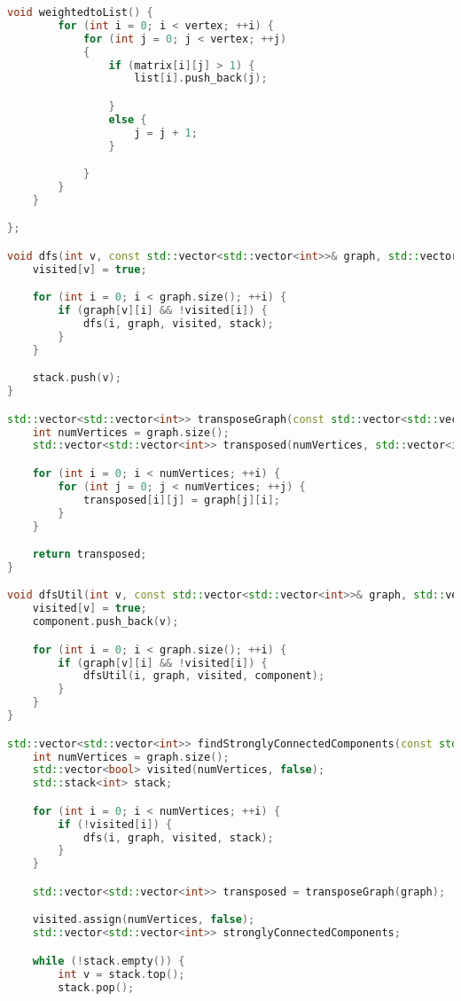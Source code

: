 \documentclass{article}
\begin{document}
\begin {small}
\begin{lstlisting}[language=C++]
    void weightedtoList() {
        for (int i = 0; i < vertex; ++i) {
            for (int j = 0; j < vertex; ++j)
            {
                if (matrix[i][j] > 1) {
                    list[i].push_back(j);

                }
                else {
                    j = j + 1;
                }

            }
        }
    }

};

void dfs(int v, const std::vector<std::vector<int>>& graph, std::vector<bool>& visited, std::stack<int>& stack) {
    visited[v] = true;

    for (int i = 0; i < graph.size(); ++i) {
        if (graph[v][i] && !visited[i]) {
            dfs(i, graph, visited, stack);
        }
    }

    stack.push(v);
}

std::vector<std::vector<int>> transposeGraph(const std::vector<std::vector<int>>& graph) {
    int numVertices = graph.size();
    std::vector<std::vector<int>> transposed(numVertices, std::vector<int>(numVertices, 0));

    for (int i = 0; i < numVertices; ++i) {
        for (int j = 0; j < numVertices; ++j) {
            transposed[i][j] = graph[j][i];
        }
    }

    return transposed;
}

void dfsUtil(int v, const std::vector<std::vector<int>>& graph, std::vector<bool>& visited, std::vector<int>& component) {
    visited[v] = true;
    component.push_back(v);

    for (int i = 0; i < graph.size(); ++i) {
        if (graph[v][i] && !visited[i]) {
            dfsUtil(i, graph, visited, component);
        }
    }
}

std::vector<std::vector<int>> findStronglyConnectedComponents(const std::vector<std::vector<int>>& graph) {
    int numVertices = graph.size();
    std::vector<bool> visited(numVertices, false);
    std::stack<int> stack;

    for (int i = 0; i < numVertices; ++i) {
        if (!visited[i]) {
            dfs(i, graph, visited, stack);
        }
    }

    std::vector<std::vector<int>> transposed = transposeGraph(graph);

    visited.assign(numVertices, false);
    std::vector<std::vector<int>> stronglyConnectedComponents;

    while (!stack.empty()) {
        int v = stack.top();
        stack.pop();


\end{lstlisting}
\end{small}
\end{document}
